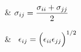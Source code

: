 \begin{mdframed}

    
    \begin{easylist}
    
    
    & $\molecrad_{ij} = \dfrac{\molecrad_{ii}+\molecrad_{jj}}{2}$ \\
    
    \medskip
    
    & ~$\dielec_{ij} = \Big(\dielec_{ii}\dielec_{jj}\Big)^{1/2} $
    
    \end{easylist}
 
\end{mdframed}